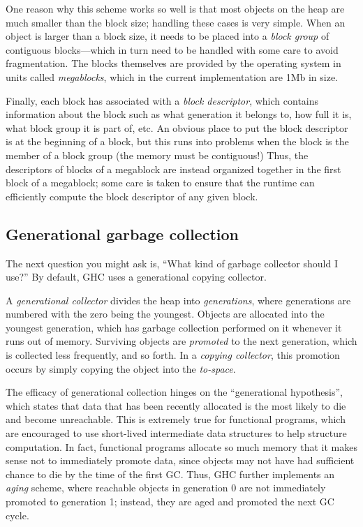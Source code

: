 One reason why this scheme works so well is that most objects on the
heap are much smaller than the block size; handling these cases is very
simple.  When an object is larger than a block size, it needs to be
placed into a \emph{block group} of contiguous blocks---which in turn
need to be handled with some care to avoid fragmentation.  The blocks
themselves are provided by the operating system in units called
\emph{megablocks}, which in the current implementation are 1Mb in size.

Finally, each block has associated with a \emph{block descriptor}, which
contains information about the block such as what generation it belongs to, how full it is, what block
group it is part of, etc.  An obvious place to put the block descriptor
is at the beginning of a block, but this runs into problems when the block
is the member of a block group (the memory must be contiguous!)
Thus, the descriptors of blocks of a megablock are instead organized together
in the first block of a megablock; some care is taken to ensure that the
runtime can efficiently compute the block descriptor of any given block.

\subsection{Generational garbage collection}

The next question you might ask is, ``What kind of garbage collector
should I use?''  By default, GHC uses a generational copying collector.

A \emph{generational collector} divides the heap into
\emph{generations}, where generations are numbered with the zero being
the youngest.  Objects are allocated into the youngest generation, which
has garbage collection performed on it whenever it runs out of memory.
Surviving objects are \emph{promoted} to the next generation, which is
collected less frequently, and so forth.  In a \emph{copying collector}, this
promotion occurs by simply copying the object into the \emph{to-space}.

The efficacy of generational collection hinges on the ``generational
hypothesis'', which states that data that has been recently allocated is
the most likely to die and become unreachable.  This is extremely true
for functional programs, which are encouraged to use short-lived
intermediate data structures to help structure computation.  In fact,
functional programs allocate so much memory that it makes sense not to
immediately promote data, since objects may not have had sufficient
chance to die by the time of the first GC.  Thus, GHC further implements
an \emph{aging} scheme, where reachable objects in generation 0 are not
immediately promoted to generation 1; instead, they are aged and
promoted the next GC cycle.

